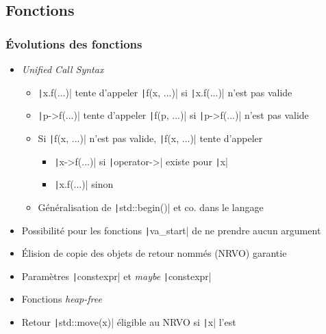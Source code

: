 \documentclass[C++.tex]{subfiles}
\begin{document}
\subsection*{Fonctions}
\begin{frame}[fragile]
	\frametitle{Évolutions des fonctions}
	\begin{itemize}
		\item \textit{Unified Call Syntax}
		\begin{itemize}
			\item \texttt|x.f(...)| tente d'appeler \texttt|f(x, ...)| si \texttt|x.f(...)| n'est pas valide
			\item \texttt|p->f(...)| tente d'appeler \texttt|f(p, ...)| si \texttt|p->f(...)| n'est pas valide
			\item Si \texttt|f(x, ...)| n'est pas valide, \texttt|f(x, ...)| tente d'appeler
			\begin{itemize}
				\item \texttt|x->f(...)| si \texttt|operator->| existe pour \texttt|x|
				\item \texttt|x.f(...)| sinon
			\end{itemize}
			\item Généralisation de \texttt|std::begin()| et co. dans le langage
		\end{itemize}
		\item Possibilité pour les fonctions \texttt|va_start| de ne prendre aucun argument
		\item Élision de copie des objets de retour nommés (NRVO) garantie


		\item Paramètres \texttt|constexpr| et \og{}\textit{maybe} \texttt|constexpr|\fg{}
		\item Fonctions \textit{heap-free}
		\item Retour \texttt|std::move(x)| éligible au NRVO si \texttt|x| l'est
	\end{itemize}

\end{frame}
\end{document}
